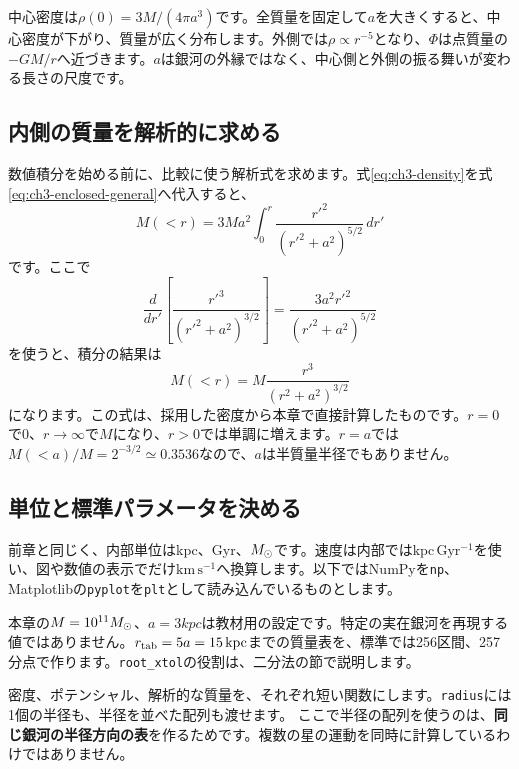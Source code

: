 中心密度は$\rho(0)=3M/(4\pi a^3)$です。全質量を固定して$a$を大きくすると、中心密度が下がり、質量が広く分布します。外側では$\rho\propto r^{-5}$となり、$\Phi$は点質量の$-GM/r$へ近づきます。$a$は銀河の外縁ではなく、中心側と外側の振る舞いが変わる長さの尺度です。

\subsection{内側の質量を解析的に求める}
数値積分を始める前に、比較に使う解析式を求めます。式\eqref{eq:ch3-density}を式\eqref{eq:ch3-enclosed-general}へ代入すると、
\begin{equation}
 M(<r)=3Ma^2\int_0^r \frac{r'^2}{(r'^2+a^2)^{5/2}}\,dr'
 \label{eq:ch3-mass-integral}
\end{equation}
です。ここで
\begin{equation}
 \frac{d}{dr'}\left[\frac{r'^3}{(r'^2+a^2)^{3/2}}\right]
 =\frac{3a^2r'^2}{(r'^2+a^2)^{5/2}}
 \label{eq:ch3-mass-derivative}
\end{equation}
を使うと、積分の結果は
\begin{equation}
 \boxed{M(<r)=M\frac{r^3}{(r^2+a^2)^{3/2}}}
 \label{eq:ch3-mass-exact}
\end{equation}
になります。この式は、採用した密度から本章で直接計算したものです。$r=0$で0、$r\to\infty$で$M$になり、$r>0$では単調に増えます。$r=a$では$M(<a)/M=2^{-3/2}\simeq0.3536$なので、$a$は半質量半径でもありません。

\subsection{単位と標準パラメータを決める}
前章と同じく、内部単位はkpc、Gyr、$M_\odot$です。速度は内部では$\mathrm{kpc\,Gyr^{-1}}$を使い、図や数値の表示でだけ$\mathrm{km\,s^{-1}}$へ換算します。以下ではNumPyを\texttt{np}、Matplotlibの\texttt{pyplot}を\texttt{plt}として読み込んでいるものとします。


本章の$M=10^{11}M_\odot$、$a=3\unit{kpc}$は教材用の設定です。特定の実在銀河を再現する値ではありません。$r_{\rm tab}=5a=15\,\mathrm{kpc}$までの質量表を、標準では256区間、257分点で作ります。\texttt{root\_xtol}の役割は、二分法の節で説明します。

密度、ポテンシャル、解析的な質量を、それぞれ短い関数にします。\texttt{radius}には1個の半径も、半径を並べた配列も渡せます。
ここで半径の配列を使うのは、\textbf{同じ銀河の半径方向の表}を作るためです。複数の星の運動を同時に計算しているわけではありません。

